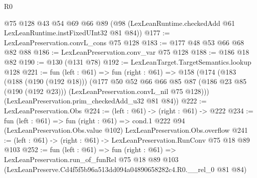 \begin{lexlean}{R0}
\begin{coremodule}
    @75
    @128
    @43
    @54
    @69
    @66
    @89
    (@98 (LexLeanRuntime.checkedAdd @61 LexLeanRuntime.instFixedUInt32 @81 @84))
@177 := LexLeanPreservation.convL_cons @75 @128
@183 := @177 @48 @53 @66 @68 @82 @88
@186 := LexLeanPreservation.conv_var @75 @128
@188 := @186 @18 @82
@190 := @130 (@131 @78)
@192 := LexLeanTarget.TargetSemantics.lookup @128
@221 := fun (left : @61) =>
  fun (right : @61) =>
  @158
    (@174
      (@183
        (@188 (@190 (@192 @18)))
        (@177
          @50
          @52
          @66
          @66
          @85
          @87
          (@186 @23 @85 (@190 (@192 @23)))
          (LexLeanPreservation.convL_nil @75 @128)))
      (LexLeanPreservation.prim_checkedAdd_u32 @81 @84))
@222 := LexLeanPreservation.Obs
@224 := (left : @61) -> (right : @61) -> @222
@234 := fun (left : @61) =>
  fun (right : @61) =>
  cond.{1} @222 @94 (LexLeanPreservation.Obs.value @102) LexLeanPreservation.Obs.overflow
@241 := (left : @61) -> (right : @61) -> LexLeanPreservation.RunConv @75 @18 @89 @103
@252 := fun (left : @61) =>
  fun (right : @61) =>
  LexLeanPreservation.run_of_funRel
    @75
    @18
    @89
    @103
    (LexLeanPreserve.Cd4f5f5b96a513dd094a04890658282c4.R0.__rel_0 @81 @84)
\end{coremodule}
\end{lexlean}
